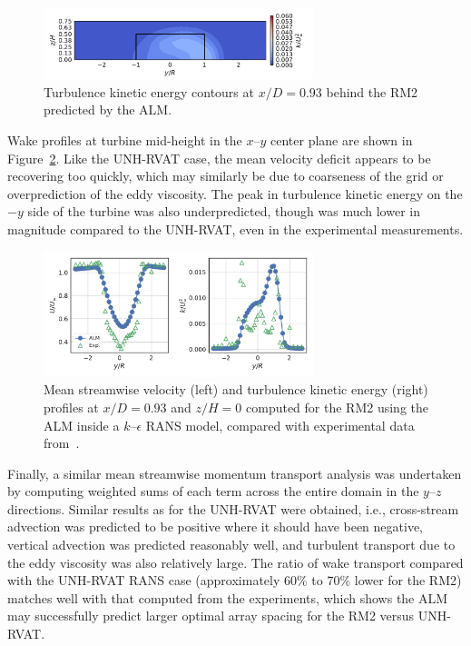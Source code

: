 \documentclass[times]{weauth}
\begin{document}
\begin{figure}
    \centering

    \includegraphics[width=0.7\textwidth]{RM2-ALM_kcont}

    \caption{Turbulence kinetic energy contours at $x/D=0.93$ behind the RM2
        predicted by the ALM.}

    \label{fig:RM2-ALM-kcont}
\end{figure}

Wake profiles at turbine mid-height in the $x$--$y$ center plane are shown in
Figure~\ref{fig:RM2-ALM-profiles}. Like the UNH-RVAT case, the mean velocity
deficit appears to be recovering too quickly, which may similarly be due to
coarseness of the grid or overprediction of the eddy viscosity. The peak in
turbulence kinetic energy on the $-y$ side of the turbine was also
underpredicted, though was much lower in magnitude compared to the UNH-RVAT,
even in the experimental measurements.

\begin{figure}
    \centering

    \includegraphics[width=0.7\textwidth]{RM2-ALM_wake-profiles}

    \caption{Mean streamwise velocity (left) and turbulence kinetic energy
        (right) profiles at $x/D=0.93$ and $z/H=0$ computed for the RM2 using the
        ALM inside a $k$--$\epsilon$ RANS model, compared with experimental data
        from~\cite{Bachant2016-RM2-data}.}

    \label{fig:RM2-ALM-profiles}
\end{figure}

Finally, a similar mean streamwise momentum transport analysis was undertaken by
computing weighted sums of each term across the entire domain in the $y$--$z$
directions. Similar results as for the UNH-RVAT were obtained, i.e.,
cross-stream advection was predicted to be positive where it should have been
negative, vertical advection was predicted reasonably well, and turbulent
transport due to the eddy viscosity was also relatively large. The ratio of wake
transport compared with the UNH-RVAT RANS case (approximately 60\% to 70\% lower
for the RM2) matches well with that computed from the experiments, which shows
the ALM may successfully predict larger optimal array spacing for the RM2 versus
UNH-RVAT.
\end{document}
